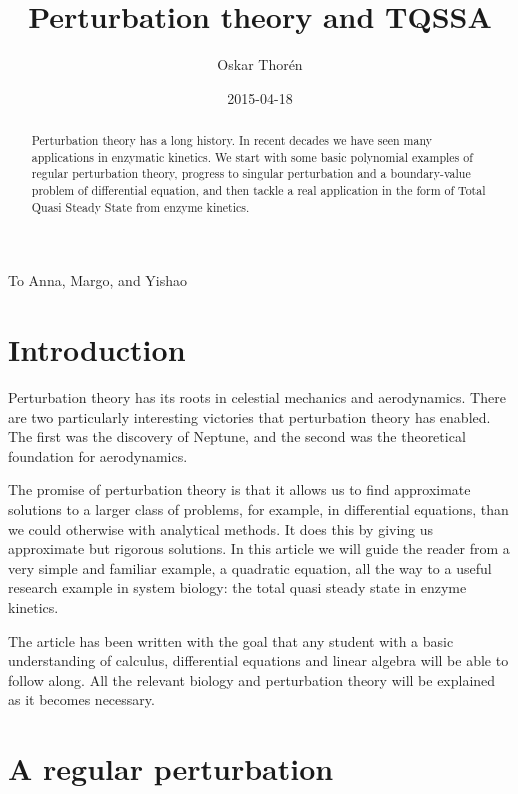 \documentclass[12pt]{article}
\title{Perturbation theory and TQSSA}
\author{Oskar Thor\'{e}n}
\date{2015-04-18}
\newenvironment{dedication}
  {\clearpage           %
   \thispagestyle{empty}%
   \vspace*{\stretch{1}}%
   \itshape             %
   \raggedleft          %
  }
  {\par %
   \vspace{\stretch{3}} %
   \clearpage           %
  }
\begin{document}
\clearpage\maketitle
\thispagestyle{empty}
\nocite{*} %

\begin{abstract}
  Perturbation theory has a long history. In recent decades we have
  seen many applications in enzymatic kinetics. We start with some
  basic polynomial examples of regular perturbation theory, progress
  to singular perturbation and a boundary-value problem of
  differential equation, and then tackle a real application in the
  form of Total Quasi Steady State from enzyme kinetics.
\end{abstract}

\begin{dedication}
To Anna, Margo, and Yishao
\end{dedication}

\clearpage
\tableofcontents\thispagestyle{empty}
\clearpage

\section{Introduction}

Perturbation theory has its roots in celestial mechanics and
aerodynamics. There are two particularly interesting victories that
perturbation theory has enabled. The first was the discovery of
Neptune, and the second was the theoretical foundation for
aerodynamics.

The promise of perturbation theory is that it allows us to find
approximate solutions to a larger class of problems, for example, in
differential equations, than we could otherwise with analytical
methods. It does this by giving us approximate but rigorous
solutions. In this article we will guide the reader from a very simple
and familiar example, a quadratic equation, all the way to a useful
research example in system biology: the total quasi steady state in
enzyme kinetics.

The article has been written with the goal that any student with a
basic understanding of calculus, differential equations and linear
algebra will be able to follow along. All the relevant biology and
perturbation theory will be explained as it becomes necessary.

\newpage
\section{A regular perturbation}
\end{document}
